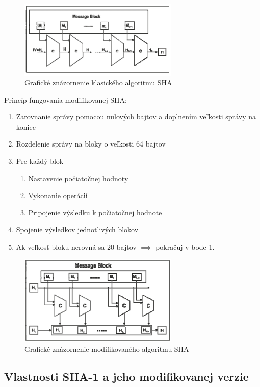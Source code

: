 \documentclass[conference]{IEEEtran}
\begin{document}
\begin{figure}[!h]
\centering
\includegraphics[width=3in]{img/SHA}
\caption{Grafické znázornenie klasického algoritmu SHA}
\end{figure}

Princíp fungovania modifikovanej SHA: 
\begin{enumerate}
	\item{Zarovnanie správy pomocou nulových bajtov a doplnením veľkosti správy na koniec}
	\item{Rozdelenie správy na bloky o veľkosti 64 bajtov}
	\item{Pre každý blok}
	\begin{enumerate}
		\item{Nastavenie počiatočnej hodnoty}
		\item{Vykonanie operácií}
		\item{Pripojenie výsledku k počiatočnej hodnote}
	\end{enumerate}
	\item{Spojenie výsledkov jednotlivých blokov}
	\item{Ak veľkosť bloku nerovná sa 20 bajtov $\implies$ pokračuj v bode 1.}
\end{enumerate}

\begin{figure}[!h]
\centering
\includegraphics[width=3in]{img/MSHA}
\caption{Grafické znázornenie modifikovaného algoritmu SHA}
\end{figure}


\subsection{Vlastnosti SHA-1 a jeho modifikovanej verzie}
\end{document}
